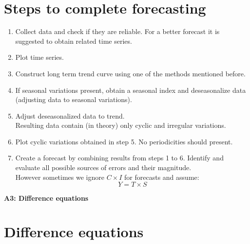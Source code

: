 \documentclass[12pt, english]{article}
\numberwithin{equation}{section} %
\theoremstyle{plain}
\theoremstyle{definition}
\begin{document}
\section{Steps to complete forecasting}
\begin{enumerate}
	\item Collect data and check if they are reliable. For a better forecast it is suggested to obtain related time series.
	\item Plot time series.
	\item Construct long term trend curve using one of the methods mentioned before.
	\item If seasonal variations present, obtain a seasonal index and deseasonalize data (adjusting data to seasonal variations).
	\item Adjust deseasonalized data to trend.\\[.5em]
		  Resulting data contain (in theory) only cyclic and irregular variations.
	\item Plot cyclic variations obtained in step 5. No periodicities should present.
	\item Create a forecast by combining results from steps 1 to 6. Identify and evaluate all possible sources of errors and their magnitude.\\[.5em]
		However sometimes we ignore $C \times I$ for forecasts and assume:
		\[
			Y = T \times S
		\]
\end{enumerate}


\newpage
\begin{center}
	\huge{\textbf{A3: Difference equations}}
\end{center}


\section{Difference equations} %
\end{document}
